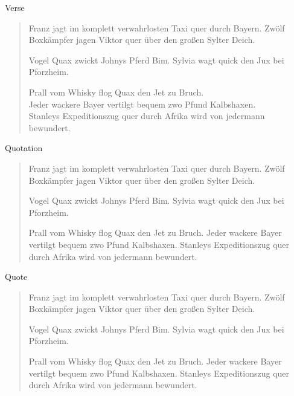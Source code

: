 	\begin{frame}{Verse}
		\begin{verse}
			Franz jagt im komplett verwahrlosten Taxi quer durch Bayern.
			Zwölf Boxkämpfer jagen Viktor quer über den großen Sylter Deich.

			Vogel Quax zwickt Johnys Pferd Bim.
			Sylvia wagt quick den Jux bei Pforzheim.

			Prall vom Whisky flog Quax den Jet zu Bruch.\\
			Jeder wackere Bayer vertilgt bequem zwo Pfund Kalbshaxen.\\
			Stanleys Expeditionszug quer durch Afrika wird von jedermann bewundert.\\
		\end{verse}
	\end{frame}


	\begin{frame}{Quotation}
		\begin{quotation}
			Franz jagt im komplett verwahrlosten Taxi quer durch Bayern.
			Zwölf Boxkämpfer jagen Viktor quer über den großen Sylter Deich.

			Vogel Quax zwickt Johnys Pferd Bim.
			Sylvia wagt quick den Jux bei Pforzheim.

			Prall vom Whisky flog Quax den Jet zu Bruch.
			Jeder wackere Bayer vertilgt bequem zwo Pfund Kalbshaxen.
			Stanleys Expeditionszug quer durch Afrika wird von jedermann bewundert.
		\end{quotation}
	\end{frame}


	\begin{frame}{Quote}
		\begin{quote}
			Franz jagt im komplett verwahrlosten Taxi quer durch Bayern.
			Zwölf Boxkämpfer jagen Viktor quer über den großen Sylter Deich.

			Vogel Quax zwickt Johnys Pferd Bim.
			Sylvia wagt quick den Jux bei Pforzheim.

			Prall vom Whisky flog Quax den Jet zu Bruch.
			Jeder wackere Bayer vertilgt bequem zwo Pfund Kalbshaxen.
			Stanleys Expeditionszug quer durch Afrika wird von jedermann bewundert.
		\end{quote}
	\end{frame}


